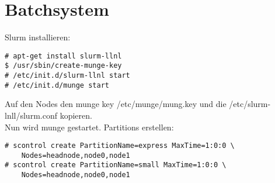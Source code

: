 \chapter{Batchsystem}
Slurm installieren:
\begin{lstlisting}[style=Bash]
# apt-get install slurm-llnl
$ /usr/sbin/create-munge-key
# /etc/init.d/slurm-llnl start
# /etc/init.d/munge start
\end{lstlisting}
Auf den Nodes den munge key /etc/munge/mung.key und die /etc/slurm-lnll/slurm.conf kopieren.\\
Nun wird munge gestartet.
Partitions erstellen:
\begin{lstlisting}[style=Bash]
# scontrol create PartitionName=express MaxTime=1:0:0 \
	Nodes=headnode,node0,node1
# scontrol create PartitionName=small MaxTime=1:0:0 \
	Nodes=headnode,node0,node1
\end{lstlisting}

